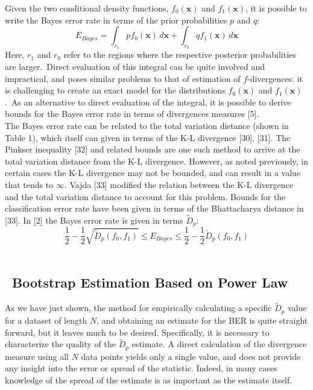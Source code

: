 \documentclass{article}
\begin{document}
	\indent Given the two conditional density functions, $f_0(\textbf{x})$ and $f_1(\textbf{x})$, it is possible to write the Bayes error rate in terms of the prior probabilities $p$ and $q$:
	\begin{equation} E_{Bayes}=\int_{r_1} pf_0(\textbf{x}) \,d\textbf{x} + \int_{r_0} qf_1(\textbf{x}) \,d\textbf{x} \end{equation}
	\indent Here, $r_1$ and $r_0$ refer to the regions where the respective posterior probabilities are larger.\ Direct evaluation of this integral can be quite involved and impractical, and poses similar problems to that of estimation of $f$-divergences: it is challenging to create an exact model for the distributions $f_0(\textbf{x})$ and $f_1(\textbf{x})$.\ As an alternative to direct evaluation of the integral, it is possible to derive bounds for the Bayes error rate in terms of divergences measures [5]. 
	\\ [0.5ex]	
	
	\indent The Bayes error rate can be related to the total variation distance (shown in Table 1), which itself can given in terms of the K-L divergence [30], [31]. The Pinkser inequality [32] and related bounds are one such method to arrive at the total variation distance from the K-L divergence. However, as noted previously, in certain cases the K-L divergence may not be bounded, and can result in a value that tends to $\infty$. Vajda [33] modified the relation between the K-L divergence and the total variation distance to account for this problem. Bounds for the classification error rate have been given in terms of the Bhattacharya distance in [33]. In [2] the Bayes error rate is given in terms $\widetilde{D}_p$:\begin{equation}
	\frac{1}{2}-\frac{1}{2}\sqrt{\widetilde{D}_p(f_0,f_1)}\leq E_{Bayes} \leq \frac{1}{2}-\frac{1}{2}\widetilde{D}_p(f_0,f_1)
	\end{equation}
	\\ [0.5ex]
	\subsection{\ Bootstrap Estimation Based on Power Law}
	\indent	As we have just shown, the method for empirically calculating a specific $\widetilde{D}_p$ value for a dataset of length $N$, and obtaining an estimate for the BER is quite straight forward, but it leaves much to be desired. Specifically, it is necessary to characterize the quality of the $\widetilde{D}_p$ estimate. A direct calculation of the divergence measure using all $N$ data points yields only a single value, and does not provide any insight into the error or spread of  the statistic. Indeed, in many cases knowledge of the spread of the estimate is as important as the estimate itself.
	\\[0.5ex]
	
\end{document}
